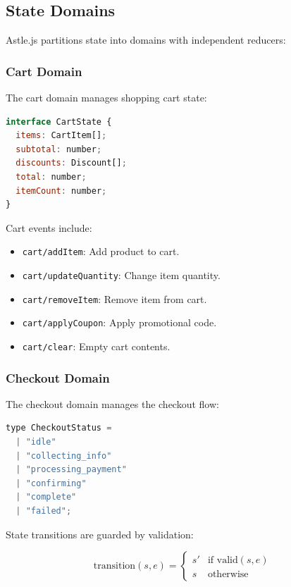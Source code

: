 \subsection{State Domains}

Astle.js partitions state into domains with independent reducers:

\subsubsection{Cart Domain}

The cart domain manages shopping cart state:

\begin{lstlisting}[language=JavaScript,caption=Cart state shape]
interface CartState {
  items: CartItem[];
  subtotal: number;
  discounts: Discount[];
  total: number;
  itemCount: number;
}
\end{lstlisting}

Cart events include:
\begin{itemize}
\item \texttt{cart/addItem}: Add product to cart.
\item \texttt{cart/updateQuantity}: Change item quantity.
\item \texttt{cart/removeItem}: Remove item from cart.
\item \texttt{cart/applyCoupon}: Apply promotional code.
\item \texttt{cart/clear}: Empty cart contents.
\end{itemize}

\subsubsection{Checkout Domain}

The checkout domain manages the checkout flow:

\begin{lstlisting}[language=JavaScript,caption=Checkout state machine]
type CheckoutStatus =
  | "idle"
  | "collecting_info"
  | "processing_payment"
  | "confirming"
  | "complete"
  | "failed";
\end{lstlisting}

State transitions are guarded by validation:

\begin{equation}
\text{transition}(s, e) = \begin{cases}
s' & \text{if valid}(s, e) \\
s & \text{otherwise}
\end{cases}
\end{equation}

